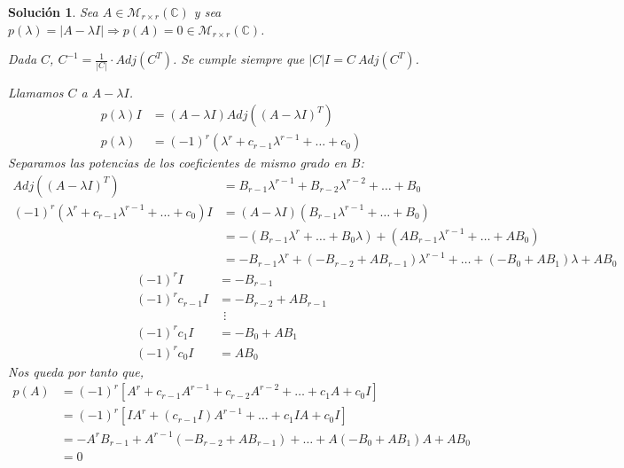 \documentclass[11pt, a4paper]{article}
\newif\IfInSansMode
\theoremstyle{theorem-style}
\theoremstyle{definition-style}
\theoremstyle{remark-style}
\newtheorem*{sol}{Solución}
\theoremstyle{example-style}
\begin{document}
    \begin{sol}
        Sea $A \in \mathcal M_{r \times r}(\mathbb C)$ y sea $p(\lambda) = |A - \lambda I| \Rightarrow p(A)= 0 \in \mathcal M_{r \times r}(\mathbb C)$.

        Dada $C$, $\displaystyle C^{-1} = \frac{1}{|C|} \cdot Adj(C^T)$. Se cumple siempre que $|C|I = C \ Adj(C^T)$.

        Llamamos $C$ a $A - \lambda I$.
        \begin{align*}
            p(\lambda)I &= (A - \lambda I)Adj((A-\lambda I)^T) \\
            p(\lambda) &= (-1)^r(\lambda^r + c_{r-1}\lambda^{r-1} + \hdots + c_0)
        \end{align*}
        Separamos las potencias de los coeficientes de mismo grado en $B$:
        \begin{align*}
            Adj((A - \lambda I)^T) &= B_{r-1}\lambda^{r-1} + B_{r-2}\lambda^{r-2} + \hdots + B_0 \\
            (-1)^r(\lambda^r + c_{r-1}\lambda^{r-1} + \hdots + c_0)I &= (A -\lambda I)(B_{r-1}\lambda^{r-1} + \hdots + B_0) \\
                                                                     &= -(B_{r-1}\lambda^r + \hdots + B_0\lambda) + (AB_{r-1}\lambda^{r-1}+\hdots + AB_0) \\
                                                                     &= -B_{r-1}\lambda^r + (-B_{r-2}+AB_{r-1})\lambda^{r-1} + \hdots + (-B_0 + AB_1)\lambda + AB_0
        \end{align*}
        \begin{align*}
            \label{}
            (-1)^rI &= -B_{r-1} \\
            (-1)^rc_{r-1}I &= -B_{r-2}+AB_{r-1} \\
                           &\ \ \vdots \\
             (-1)^rc_1I &= -B_0 + AB_1 \\
            (-1)^rc_0I &= AB_0
        \end{align*}
        Nos queda por tanto que,
        \begin{align*}
            \label{}
            p(A) &= (-1)^r \left[ A^r + c_{r-1}A^{r-1} + c_{r-2}A^{r-2} + \hdots + c_1A + c_0I \right] \\
                 &= (-1)^r \left[ IA^r + (c_{r-1}I)A^{r-1} + \hdots + c_1IA + c_0I \right] \\
                 &= -A^{r}B_{r-1}+A^{r-1}(-B_{r-2}+AB_{r-1}) + \hdots + A(-B_0 + AB_1)A + AB_0 \\ 
                 &= 0
        \end{align*}
    \end{sol}
\end{document}
